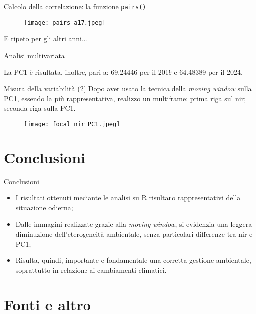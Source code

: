 \documentclass{beamer} %
\begin{document}
\begin{frame}{Calcolo della correlazione: la funzione \texttt{pairs()} }
    
    \begin{figure}
        \centering
        \texttt{[image: pairs\_a17.jpeg]}
    \end{figure}
    E ripeto per gli altri anni...
\end{frame}

\begin{frame}{Analisi multivariata}
    
    \bigskip
    La PC1 è risultata, inoltre, pari a: 69.24446 per il 2019 e 64.48389 per il 2024.
    \end{frame}

\begin{frame}{Misura della variabilità (2)}
    Dopo aver usato la tecnica della \textit{moving window} sulla PC1, essendo la più rappresentativa, realizzo un multiframe: prima riga sul nir; seconda riga sulla PC1.
    \begin{figure}
        \centering
        \texttt{[image: focal\_nir\_PC1.jpeg]}
    \end{figure}
\end{frame}

\section{Conclusioni}
\begin{frame}{Conclusioni}
    \begin{itemize}
        \item 
I risultati ottenuti mediante le analisi su R risultano rappresentativi della situazione odierna;
\bigskip
       \pause \item 
Dalle immagini realizzate grazie alla \textit{moving window}, si evidenzia una leggera diminuzione dell'eterogeneità ambientale, senza particolari differenze tra nir e PC1;
       \pause \item 
\bigskip
Risulta, quindi, importante e fondamentale una corretta gestione ambientale, soprattutto in relazione ai cambiamenti climatici.
    \end{itemize}
\end{frame}

\section{Fonti e altro}
\end{document}
